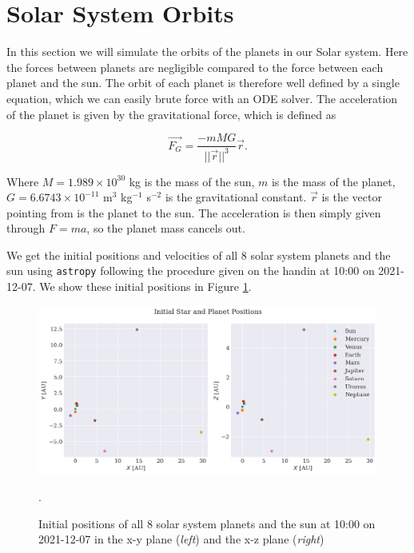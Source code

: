\section{Solar System Orbits}



In this section we will simulate the orbits of the planets in our Solar system. Here the forces between planets are negligible compared to the force between each planet and the sun. The orbit of each planet is therefore well defined by a single equation, which we can easily brute force with an ODE solver. The acceleration of the planet is given by the gravitational force, which is defined as

\begin{equation}
    \vec{F_G} = \frac{-mMG}{||\vec{r}||^3} \vec{r}.
\end{equation}

Where $M = 1.989 \times 10^{30}$ kg is the mass of the sun, $m$ is the mass of the planet, $G = 6.6743 \times 10^{-11}$ m$^3$ kg$^{-1}$ s$^{-2}$ is the gravitational constant. $\vec{r}$ is the vector pointing from is the planet to the sun. The acceleration is then simply given through $F = ma$, so the planet mass cancels out.

We get the initial positions and velocities of all 8 solar system planets and the sun using \texttt{astropy} following the procedure given on the handin at 10:00 on 2021-12-07. We show these initial positions in Figure \ref{fig:initial_pos}.

\begin{figure}
    \centering
    \includegraphics[width=\textwidth]{results/initial_positions.png}
    \caption{Initial positions of all 8 solar system planets and the sun at 10:00 on 2021-12-07 in the x-y plane (\textit{left}) and the x-z plane (\textit{right})}. 
    \label{fig:initial_pos}
\end{figure}


